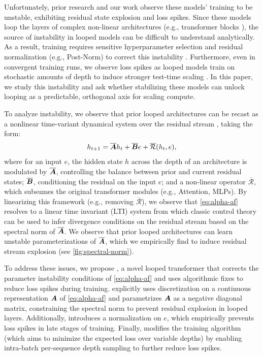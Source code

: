 Unfortunately, prior research \citep{geiping_scaling_2025, mcleish_retrofitted_recurrence, LoopFormerElasticDepthLooped2025} and our work observe these models' training to be unstable, exhibiting residual state explosion and loss spikes.
Since these models loop the layers of complex non-linear architectures (e.g., transformer blocks \citep{vaswani2023attentionneed}), the source of instability in looped models can be difficult to understand analytically.
As a result, training requires sensitive hyperparameter selection and {residual normalization} (e.g., Post-Norm) to correct this instability \citep{geiping_scaling_2025}. 
Furthermore, even in convergent training runs, we observe loss spikes as looped models train on stochastic amounts of depth to induce stronger test-time scaling \citep{anilPathIndependentEquilibrium}.
In this paper, we study this instability and ask whether stabilizing these models can unlock looping as a predictable, orthogonal axis for scaling compute.

To analyze instability, we observe that prior looped architectures can be recast as a nonlinear time-variant dynamical system over the residual stream \citep{olsson2022incontextlearninginductionheads}, taking the form:
\begin{equation}
    \label{eq:alpha-af}
    h_{t+1} = \overline{\bm{A}} h_t + \overline{\bm{B}} e + \overline{\mathcal{R}}(h_t, e),
\end{equation}
where for an input $e$, the hidden state $h$ across the depth of an architecture is modulated by $\overline{\bm{A}}$, controlling the balance between prior and current residual states; $\overline{\bm{B}}$, conditioning the residual on the input $e$; and a non-linear operator $\overline{\mathcal{R}}$, which subsumes the original transformer modules (e.g., Attention, MLPs).
By linearizing this framework (e.g., removing $\overline{\mathcal{R}}$), we observe that \cref{eq:alpha-af} resolves to a linear time invariant (LTI) system from which classic control theory can be used to infer divergence conditions on the residual stream based on the spectral norm of $\overline{\bm{A}}$.
We observe that prior looped architectures can learn unstable parameterizations of $\overline{\bm{A}}$, which we empirically find to induce residual stream explosion (see \cref{fig:spectral-norm}).

To address these issues, we propose \emph{\textbf{\sysname}}, a novel looped transformer that corrects the parameter instability conditions of \cref{eq:alpha-af} and uses algorithmic fixes to reduce loss spikes during training. \emph{\textbf{\sysname}} explicitly uses discretization on a continuous representation $\bm{A}$ of \cref{eq:alpha-af} and parametrizes $\bm{A}$ as a negative diagonal matrix, constraining the spectral norm to prevent residual explosion in looped layers.
Additionally, \sysname introduces a normalization on $e$, which empirically prevents loss spikes in late stages of training. Finally, \sysname 
modifies the training algorithm (which aims to minimize the expected loss over variable depths) by enabling intra-batch per-sequence depth sampling to further reduce loss spikes.


